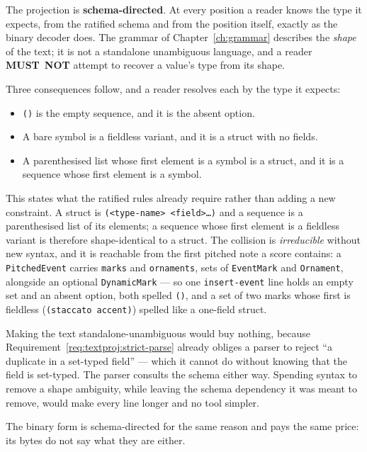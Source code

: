 \documentclass[11pt,letterpaper]{report}
\newcounter{requirement}[chapter]
\newcommand{\MUSTNOT}{\textbf{MUST}\nobreak\ \textbf{NOT}}
\begin{document}
\begin{requirement}
  \label{req:textproj:schema-directed}
  The projection is \textbf{schema-directed}. At every position a reader knows
  the type it expects, from the ratified schema and from the position itself,
  exactly as the binary decoder does. The grammar of
  Chapter~\ref{ch:grammar} describes the \emph{shape} of the text; it is not a
  standalone unambiguous language, and a reader \MUSTNOT{} attempt to recover a
  value's type from its shape.

  Three consequences follow, and a reader resolves each by the type it expects:

  \begin{itemize}
    \item \texttt{()} is the empty sequence, and it is the absent option.
    \item A bare symbol is a fieldless variant, and it is a struct with no
      fields.
    \item A parenthesised list whose first element is a symbol is a struct, and
      it is a sequence whose first element is a symbol.
  \end{itemize}
\end{requirement}

\begin{rationale}
  This states what the ratified rules already require rather than adding a new
  constraint. A struct is \texttt{(<type-name> <field>\ldots)} and a sequence is
  a parenthesised list of its elements; a sequence whose first element is a
  fieldless variant is therefore shape-identical to a struct. The collision is
  \emph{irreducible} without new syntax, and it is reachable from the first
  pitched note a score contains: a \texttt{PitchedEvent} carries
  \texttt{marks} and \texttt{ornaments}, sets of \texttt{EventMark} and
  \texttt{Ornament}, alongside an optional \texttt{DynamicMark} --- so one
  \texttt{insert-event} line holds an empty set and an absent option, both
  spelled \texttt{()}, and a set of two marks whose first is fieldless
  (\texttt{(staccato accent)}) spelled like a one-field struct.

  Making the text standalone-unambiguous would buy nothing, because
  Requirement~\ref{req:textproj:strict-parse} already obliges a parser to reject
  ``a duplicate in a set-typed field'' --- which it cannot do without knowing that
  the field is set-typed. The parser consults the schema either way. Spending
  syntax to remove a shape ambiguity, while leaving the schema dependency it was
  meant to remove, would make every line longer and no tool simpler.

  The binary form is schema-directed for the same reason and pays the same price:
  its bytes do not say what they are either.
\end{rationale}
\end{document}
